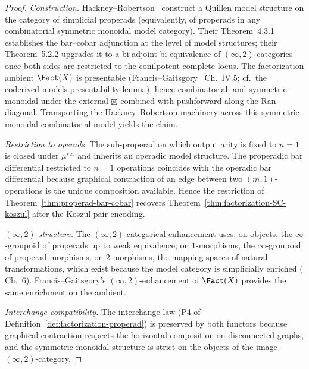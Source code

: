 \begin{proof}
\textit{Construction.} Hackney--Robertson~\cite{HRY20} construct a
Quillen model structure on the category of simplicial properads
(equivalently, of properads in any combinatorial symmetric monoidal
model category). Their Theorem~4.3.1 establishes the bar--cobar
adjunction at the level of model structures; their Theorem~5.2.2
upgrades it to a bi-adjoint bi-equivalence of
$(\infty,2)$-categories once both sides are restricted to the
conilpotent-complete locus. The factorization ambient
$\Fact(X)$ is presentable (Francis--Gaitsgory~\cite{FG12}
Ch.~IV.5; cf.\ the coderived-models presentability lemma),
hence combinatorial, and
symmetric monoidal under the external $\boxtimes$ combined with
pushforward along the Ran diagonal. Transporting the
Hackney--Robertson machinery across this symmetric monoidal
combinatorial model yields the claim.

\textit{Restriction to operads.} The sub-properad on which
output arity is fixed to $n=1$ is closed under $\mu^{\mathrm{ver}}$
and inherits an operadic model structure. The properadic bar
differential restricted to $n=1$ operations coincides with the
operadic bar differential because graphical contraction of an
edge between two $(m,1)$-operations is the unique composition
available. Hence the restriction of Theorem~\ref{thm:properad-bar-cobar}
recovers Theorem~\ref{thm:factorization-SC-koszul} after the
Koszul-pair encoding.

\textit{$(\infty,2)$-structure.} The $(\infty,2)$-categorical
enhancement uses, on objects, the $\infty$-groupoid of
properads up to weak equivalence; on $1$-morphisms, the
$\infty$-groupoid of properad morphisms; on $2$-morphisms,
the mapping spaces of natural transformations, which exist
because the model category is simplicially enriched
(\cite{HRY20} Ch.~6). Francis--Gaitsgory's $(\infty,2)$-enhancement
of $\Fact(X)$ provides the same enrichment on the ambient.

\textit{Interchange compatibility.} The interchange law
(P4 of Definition~\ref{def:factorization-properad}) is preserved
by both functors because graphical contraction respects the
horizontal composition on disconnected graphs, and the
symmetric-monoidal structure is strict on the objects of the
image $(\infty,2)$-category.
\end{proof}

